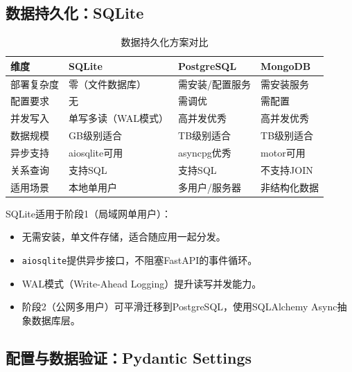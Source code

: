 \documentclass[fontset=mac,a4paper,11pt]{ctexart}
\begin{document}
\subsection{数据持久化：SQLite}

\begin{table}[H]
\centering
\caption{数据持久化方案对比}
\label{tab:database}
\begin{tabular}{L{2.5cm}L{3.5cm}L{3.5cm}L{3.5cm}}
\toprule
\textbf{维度} & \textbf{SQLite} & \textbf{PostgreSQL} & \textbf{MongoDB} \\
\midrule
{}
部署复杂度 & 零（文件数据库） & 需安装/配置服务 & 需安装服务 \\
配置要求 & 无 & 需调优 & 需配置 \\
并发写入 & 单写多读（WAL模式） & 高并发优秀 & 高并发优秀 \\
数据规模 & GB级别适合 & TB级别适合 & TB级别适合 \\
异步支持 & aiosqlite可用 & asyncpg优秀 & motor可用 \\
关系查询 & 支持SQL & 支持SQL & 不支持JOIN \\
适用场景 & 本地单用户 & 多用户/服务器 & 非结构化数据 \\
\bottomrule
\end{tabular}
\end{table}

SQLite适用于阶段1（局域网单用户）：
\begin{itemize}[leftmargin=2em]
\item 无需安装，单文件存储，适合随应用一起分发。
\item \texttt{aiosqlite}提供异步接口，不阻塞FastAPI的事件循环。
\item WAL模式（Write-Ahead Logging）提升读写并发能力。
\item 阶段2（公网多用户）可平滑迁移到PostgreSQL，使用SQLAlchemy Async抽象数据库层。
\end{itemize}

\subsection{配置与数据验证：Pydantic Settings}
\end{document}
